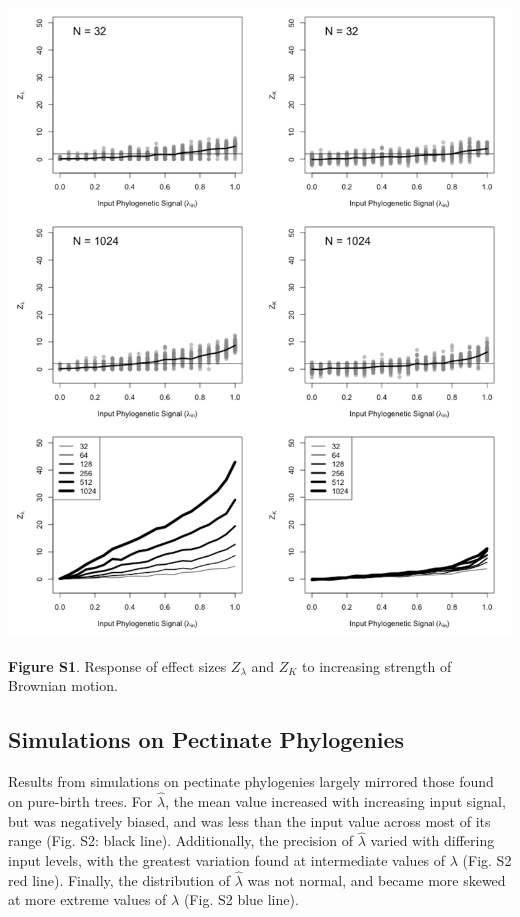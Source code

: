 \documentclass[
]{article}
\begin{document}
\includegraphics[width=0.95\linewidth]{fig.S1}

\textbf{Figure S1}. Response of effect sizes \(Z_{\lambda}\) and \(Z_K\)
to increasing strength of Brownian motion.

\newpage

\hypertarget{simulations-on-pectinate-phylogenies}{%
\subsection{Simulations on Pectinate
Phylogenies}\label{simulations-on-pectinate-phylogenies}}

Results from simulations on pectinate phylogenies largely mirrored those
found on pure-birth trees. For \(\hat{\lambda}\), the mean value
increased with increasing input signal, but was negatively biased, and
was less than the input value across most of its range (Fig. S2: black
line). Additionally, the precision of \(\hat{\lambda}\) varied with
differing input levels, with the greatest variation found at
intermediate values of \(\lambda\) (Fig. S2 red line). Finally, the
distribution of \(\hat{\lambda}\) was not normal, and became more skewed
at more extreme values of \(\lambda\) (Fig. S2 blue line). \hfill\break
\end{document}
